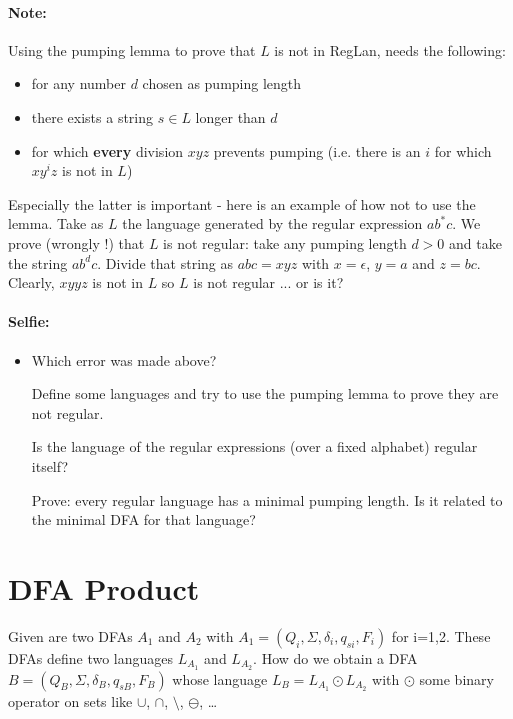 \paragraph{Note:} Using the pumping lemma to prove that $L$ is not
in RegLan, needs the following:
\begin{itemize}
\item for any number $d$ chosen as pumping length
\item there exists a string $s \in L$ longer than $d$
\item for which {\bf every} division $xyz$ prevents pumping
  (i.e. there is an $i$ for which $xy^iz$ is not in $L$)
\end{itemize}

Especially the latter is important - here is an example of how not to
use the lemma. Take as $L$ the language generated by the regular
expression $ab^*c$.  We prove (wrongly !) that $L$ is not regular:
take any pumping length $d > 0$ and take the string $ab^dc$. Divide that
string as $abc = xyz$ with $x = \epsilon$, $y = a$ and $z =
bc$. Clearly, $xyyz$ is not in $L$ so $L$ is not regular ... or is it?

\paragraph{Selfie:}
\begin{itemize}
\item[]
Which error was made above?

Define some languages and try to use the pumping lemma to prove they
are not regular.

Is the language of the regular expressions (over a fixed alphabet)
regular itself?

Prove: every regular language has a minimal pumping length. Is it
related to the minimal DFA for that language?
\end{itemize}

\section{DFA Product}

Given are two DFAs $A_1$ and $A_2$ with $A_1 = (Q_i,\Sigma,\delta_i,q_{si},F_i)$ for
i=1,2. These DFAs define two languages $L_{A_1}$ and $L_{A_2}$. How do we obtain
a DFA $B = (Q_B,\Sigma,\delta_B,q_{sB},F_B)$ whose language $L_B = L_{A_1}
\odot L_{A_2}$ with $\odot$ some binary operator on sets like $\cup$,
$\cap$, $\setminus$, $\ominus$, \ldots

